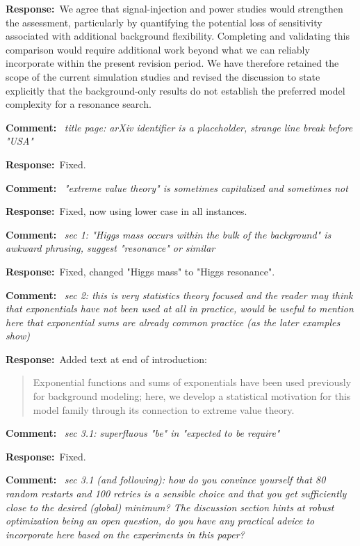 \documentclass[11pt,a4paper]{article}
\newcommand{\refcomment}[1]{%
    \medskip\noindent\textbf{\color{refcolor}Comment:}\ %
    {\itshape #1}\par\smallskip
}
\newcommand{\response}{\noindent\textbf{Response:}\ }
\newcommand{\addedtext}[1]{%
    \smallskip\begin{quote}\color{quotecolor}\small #1\end{quote}\smallskip
}
\begin{document}
\response We agree that signal-injection and power studies would strengthen the assessment, particularly by quantifying the potential loss of sensitivity associated with additional background flexibility. Completing and validating this comparison would require additional work beyond what we can reliably incorporate within the present revision period. We have therefore retained the scope of the current simulation studies and revised the discussion to state explicitly that the background-only results do not establish the preferred model complexity for a resonance search.

\refcomment{title page: arXiv identifier is a placeholder, strange line break before "USA"}
\response Fixed.

\refcomment{"extreme value theory" is sometimes capitalized and sometimes not}
\response Fixed, now using lower case in all instances.

\refcomment{sec 1: "Higgs mass occurs within the bulk of the background" is awkward phrasing, suggest "resonance" or similar}
\response Fixed, changed "Higgs mass" to "Higgs resonance".

\refcomment{sec 2: this is very statistics theory focused and the reader may think
that exponentials have not been used at all in practice, would be useful
to mention here that exponential sums are already common practice
(as the later examples show)}
\response Added text at end of introduction:
\addedtext{Exponential functions and sums of exponentials have been used previously for background modeling; here, we develop a statistical motivation for this model family through its connection to extreme value theory.}

\refcomment{sec 3.1: superfluous "be" in "expected to be require"}
\response Fixed.

\refcomment{sec 3.1 (and following): how do you convince yourself that 80 random
restarts and 100 retries is a sensible choice and that you get sufficiently
close to the desired (global) minimum? The discussion section hints at
robust optimization being an open question, do you have any practical
advice to incorporate here based on the experiments in this paper?}
\end{document}
